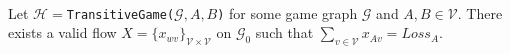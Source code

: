 \begin{lemma} \ \\
   \label{gameflow}
   Let $\mathcal{H} = $\texttt{TransitiveGame(}$\mathcal{G}, A, B$\texttt{)} for some game graph $\mathcal{G}$ and $A,
   B \in \mathcal{V}$. There exists a valid flow
   $X = \{x_{wv}\}_{\mathcal{V} \times \mathcal{V}}$ on $\mathcal{G}_0$ such that
   $\sum\limits_{v \in \mathcal{V}}x_{Av} = Loss_A$.
\end{lemma}
